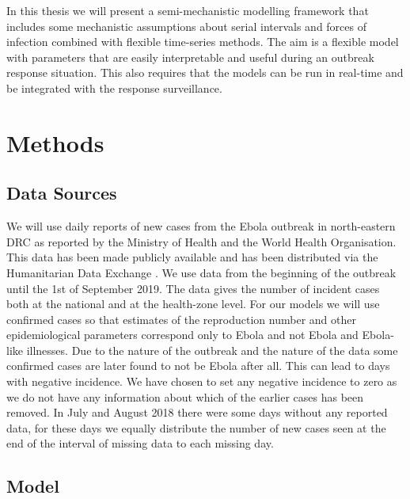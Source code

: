\documentclass[12pt]{article}
\begin{document}
In this thesis we will present a semi-mechanistic modelling framework that includes some mechanistic assumptions about serial intervals and forces of infection combined with flexible time-series methods. The aim is a flexible model with parameters that are easily interpretable and useful during an outbreak response situation. This also requires that the models can be run in real-time and be integrated with the response surveillance. 

\section{Methods}

\subsection{Data Sources}

We will use daily reports of new cases from the Ebola outbreak in north-eastern DRC as reported by the Ministry of Health and the World Health Organisation. This data has been made publicly available and has been distributed via the Humanitarian Data Exchange \cite{hummanitariandataexchangeEbolaCasesDeaths}. We use data from the beginning of the outbreak until the 1st of September 2019. The data gives the number of incident cases both at the national and at the health-zone level. For our models we will use confirmed cases so that estimates of the reproduction number and other epidemiological parameters correspond only to Ebola and not Ebola and Ebola-like illnesses. Due to the nature of the outbreak and the nature of the data some confirmed cases are later found to not be Ebola after all. This can lead to days with negative incidence. We have chosen to set any negative incidence to zero as we do not have any information about which of the earlier cases has been removed. In July and August 2018 there were some days without any reported data, for these days we equally distribute the number of new cases seen at the end of the interval of missing data to each missing day. 

\subsection{Model}
\end{document}
